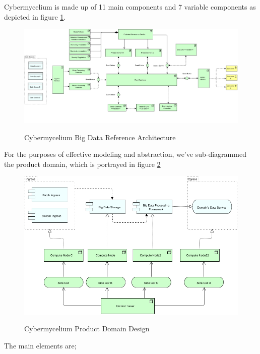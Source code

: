 \documentclass[review]{elsarticle}
\begin{document}
Cybermycelium is made up of 11 main components and 7 variable components as depicted in figure \ref{fig:Cybermycelium}.

\begin{figure}[h!]
    \centering
    \includegraphics[width=12cm]{Media/Cybermycelium.jpg}
    \label{fig:Cybermycelium}
    \caption{Cybermycelium Big Data Reference Architecture}
\end{figure}

For the purposes of effective modeling and abstraction, we've sub-diagrammed the product domain, which is portrayed in figure \ref{fig:Cybermycelium Product Domain Design}

\begin{figure}[h!]
    \centering
    \includegraphics[width=12cm]{Media/Product Domain.jpg}
    \label{fig:Cybermycelium Product Domain Design}
    \caption{Cybermycelium Product Domain Design}
\end{figure}

The main elements are; 
\end{document}

